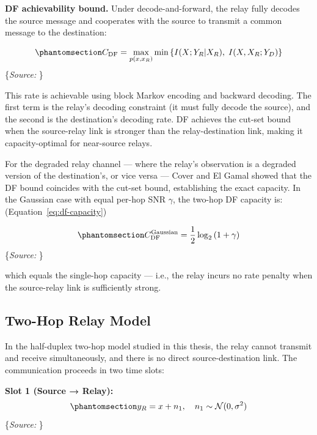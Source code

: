 \documentclass[
  english,
  12pt,
  12pt,
  a4paper,
  oneside]{report}
\begin{document}
\textbf{DF achievability bound.} Under decode-and-forward, the relay fully decodes the source message and cooperates with the source to transmit a common message to the destination:

\begin{equation}\protect\phantomsection\label{eq:df-capacity}{C_{\text{DF}} = \max_{p(x, x_R)} \min\left\{I(X; Y_R | X_R), \; I(X, X_R; Y_D)\right\}
}\end{equation} \footnotesize\{\textit{Source: \1}\}\normalsize

This rate is achievable using block Markov encoding and backward decoding. The first term is the relay's decoding constraint (it must fully decode the source), and the second is the destination's decoding rate. DF achieves the cut-set bound when the source-relay link is stronger than the relay-destination link, making it capacity-optimal for near-source relays.

For the degraded relay channel --- where the relay's observation is a degraded version of the destination's, or vice versa --- Cover and El Gamal showed that the DF bound coincides with the cut-set bound, establishing the exact capacity. In the Gaussian case with equal per-hop SNR \(\gamma\), the two-hop DF capacity is: (Equation~\ref{eq:df-capacity})

\begin{equation}\protect\phantomsection\label{eq:df-gaussian-capacity}{C_{\text{DF}}^{\text{Gaussian}} = \frac{1}{2}\log_2\left(1 + \gamma\right)
}\end{equation} \footnotesize\{\textit{Source: \1}\}\normalsize

which equals the single-hop capacity --- i.e., the relay incurs no rate penalty when the source-relay link is sufficiently strong.

\subsection{Two-Hop Relay Model}\label{sec:two-hop-relay-model}

In the half-duplex two-hop model studied in this thesis, the relay cannot transmit and receive simultaneously, and there is no direct source-destination link. The communication proceeds in two time slots:

\textbf{Slot 1 (Source → Relay):} \begin{equation}\protect\phantomsection\label{eq:awgn-hop1}{y_R = x + n_1, \quad n_1 \sim \mathcal{N}(0, \sigma^2)
}\end{equation} \footnotesize\{\textit{Source: \1}\}\normalsize
\end{document}
